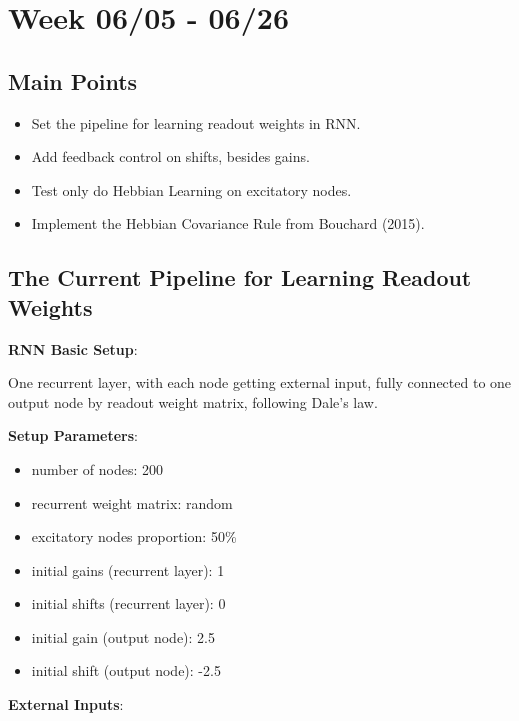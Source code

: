 \documentclass[12pt, a4paper]{article}
\begin{document}
\newpage

\section*{Week 06/05 - 06/26}

\subsection*{Main Points}

\noindent
\begin{itemize}
    \item Set the pipeline for learning readout weights in RNN.
    \item Add feedback control on shifts, besides gains.
    \item Test only do Hebbian Learning on excitatory nodes.
    \item Implement the Hebbian Covariance Rule from Bouchard (2015).
\end{itemize}

\newpage

\subsection*{The Current Pipeline for Learning Readout Weights}

\noindent
\textbf{RNN Basic Setup}:

One recurrent layer, with each node getting external input, fully connected to one output node by readout weight matrix, following Dale's law.

\vspace{10pt}

\noindent
\textbf{Setup Parameters}:

\begin{itemize}
    \item number of nodes: 200
    \item recurrent weight matrix: random
    \item excitatory nodes proportion: 50\%
    \item initial gains (recurrent layer): 1
    \item initial shifts (recurrent layer): 0
    \item initial gain (output node): 2.5
    \item initial shift (output node): -2.5
\end{itemize}

\noindent
\textbf{External Inputs}:
\end{document}
